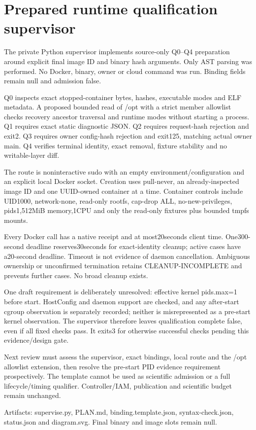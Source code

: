 \documentclass[11pt]{article}
\begin{document}
\section*{Prepared runtime qualification supervisor}
The private Python supervisor implements source-only Q0--Q4 preparation around explicit final image ID and binary hash arguments. Only AST parsing was performed. No Docker, binary, owner or cloud command was run. Binding fields remain null and admission false.

Q0 inspects exact stopped-container bytes, hashes, executable modes and ELF metadata. A proposed bounded read of /opt with a strict member allowlist checks recovery ancestor traversal and runtime modes without starting a process. Q1 requires exact static diagnostic JSON. Q2 requires request-hash rejection and exit2. Q3 requires owner config-hash rejection and exit125, matching actual owner main. Q4 verifies terminal identity, exact removal, fixture stability and no writable-layer diff.

The route is noninteractive sudo with an empty environment/configuration and an explicit local Docker socket. Creation uses pull-never, an already-inspected image ID and one UUID-owned container at a time. Container controls include UID1000, network-none, read-only rootfs, cap-drop ALL, no-new-privileges, pids1,512MiB memory,1CPU and only the read-only fixtures plus bounded tmpfs mounts.

Every Docker call has a native receipt and at most20seconds client time. One300-second deadline reserves30seconds for exact-identity cleanup; active cases have a20-second deadline. Timeout is not evidence of daemon cancellation. Ambiguous ownership or unconfirmed termination retains CLEANUP-INCOMPLETE and prevents further cases. No broad cleanup exists.

One draft requirement is deliberately unresolved: effective kernel pids.max=1 before start. HostConfig and daemon support are checked, and any after-start cgroup observation is separately recorded; neither is misrepresented as a pre-start kernel observation. The supervisor therefore leaves qualification complete false, even if all fixed checks pass. It exits3 for otherwise successful checks pending this evidence/design gate.

Next review must assess the supervisor, exact bindings, local route and the /opt allowlist extension, then resolve the pre-start PID evidence requirement prospectively. The template cannot be used as scientific admission or a full lifecycle/timing qualifier. Controller/IAM, publication and scientific budget remain unchanged.

Artifacts: supervise.py, PLAN.md, binding.template.json, syntax-check.json, status.json and diagram.svg. Final binary and image slots remain null.
\end{document}
